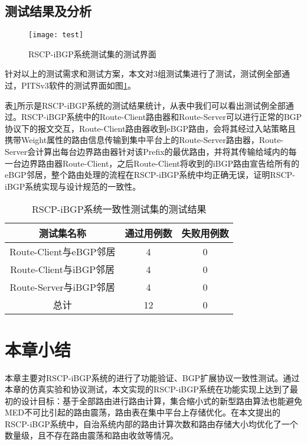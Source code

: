 \subsection{测试结果及分析}


\begin{figure}
  \centering
  \texttt{[image: test]}
  \caption{RSCP-iBGP系统测试集的测试界面}
  \label{fig:test}
\end{figure}


针对以上的测试需求和测试方案，本文对3组测试集进行了测试，测试例全部通过，PITSv3软件的测试界面如图\ref{fig:test}。

表\ref{tab:res}所示是RSCP-iBGP系统的测试结果统计，从表中我们可以看出测试例全部通过。RSCP-iBGP系统中的Route-Client路由器和Route-Server可以进行正常的BGP协议下的报文交互，Route-Client路由器收到eBGP路由，会将其经过入站策略且携带Weight属性的路由信息传输到集中平台上的Route-Server路由器，Route-Server会计算出每台边界路由器针对该Prefix的最优路由，并将其传输给域内的每一台边界路由器Route-Client，之后Route-Client将收到的iBGP路由宣告给所有的eBGP邻居，整个路由处理的流程在RSCP-iBGP系统中均正确无误，证明RSCP-iBGP系统实现与设计规范的一致性。


\begin{table}[]
\centering
\caption{RSCP-iBGP系统一致性测试集的测试结果}
\label{tab:res}
\begin{tabular}{@{}ccc@{}}
\toprule
测试集名称               & 通过用例数 & 失败用例数 \\ \midrule
Route-Client与eBGP邻居 & 4     & 0     \\
Route-Client与iBGP邻居 & 4     & 0     \\
Route-Server与iBGP邻居 & 4     & 0     \\
总计                  & 12    & 0     \\ \bottomrule
\end{tabular}
\end{table}


\section{本章小结}

本章主要对RSCP-iBGP系统的进行了功能验证、BGP扩展协议一致性测试。通过本章的仿真实验和协议测试，本文实现的RSCP-iBGP系统在功能实现上达到了最初的设计目标：基于全部路由进行路由计算，集合缩小式的新型路由算法也能避免MED不可比引起的路由震荡，路由表在集中平台上存储优化。在本文提出的RSCP-iBGP系统中，自治系统内部的路由计算次数和路由存储大小均优化了一个数量级，且不存在路由震荡和路由收敛等情况。
